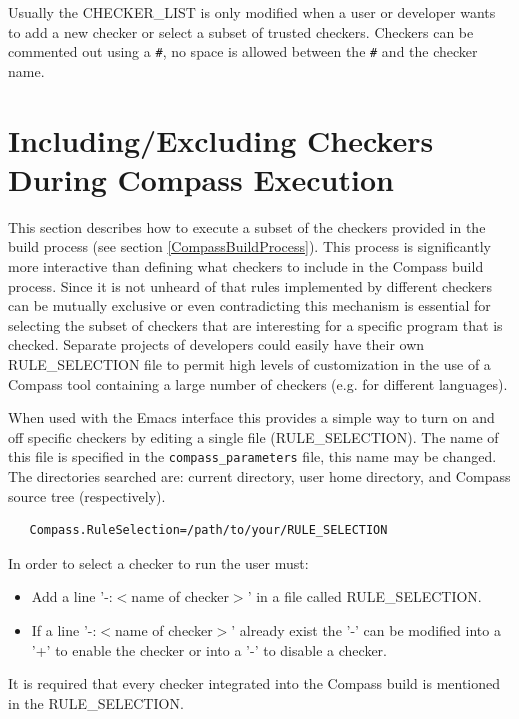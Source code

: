 Usually the CHECKER\_LIST is only modified when a user or developer wants to 
add a new checker or select a subset of trusted checkers.  Checkers can be
commented out using a {\tt \#}, no space is allowed between the {\tt \#} 
and the checker name.

\section{Including/Excluding Checkers During Compass Execution}
\label{ruleselection}

   This section describes how to execute a subset of the checkers provided in the build
process (see section \ref{CompassBuildProcess}). This process is significantly more
interactive than defining what checkers to include in the Compass build process.
Since it is not unheard of that rules implemented by different checkers can be  
mutually exclusive or even contradicting this mechanism is essential for selecting the
subset of checkers that are interesting for a specific program that is checked.
Separate projects of developers could easily have their own RULE\_SELECTION file
to permit high levels of customization in the use of a Compass tool containing
a large number of checkers (e.g. for different languages).

   When used with the Emacs interface this provides a simple way to turn on and off
specific checkers by editing a single file (RULE\_SELECTION).  The name of this
file is specified in the {\tt compass\_parameters} file, this name may be changed.
The directories searched are: current directory, user home directory, and Compass
source tree (respectively). 

\begin{verbatim}
   Compass.RuleSelection=/path/to/your/RULE_SELECTION
\end{verbatim}

In order to select a checker to run the user must:
\begin{itemize}
   \item Add a line '-:$<$name of checker$>$' in a file called RULE\_SELECTION. 
   \item If a line  '-:$<$name of checker$>$' already exist the '-' can be modified into
a '+' to enable the checker or into a '-' to disable a checker.
\end{itemize}
It is required that every checker integrated into the Compass build is mentioned in
the RULE\_SELECTION.


